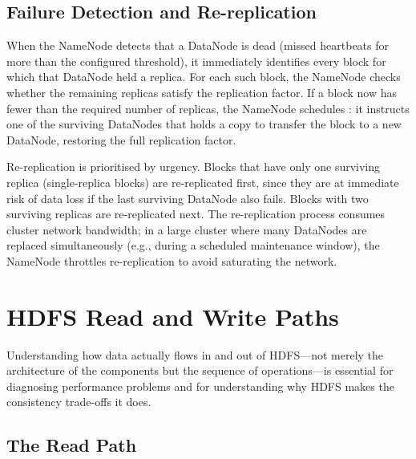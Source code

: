 \subsection{Failure Detection and Re-replication}
\label{subsec:re-replication}

When the NameNode detects that a DataNode is dead (missed heartbeats
for more than the configured threshold), it immediately identifies
every block for which that DataNode held a replica. For each such
block, the NameNode checks whether the remaining replicas satisfy the
replication factor. If a block now has fewer than the required number
of replicas, the NameNode schedules : it instructs
one of the surviving DataNodes that holds a copy to transfer the block
to a new DataNode, restoring the full replication factor.

Re-replication is prioritised by urgency. Blocks that have only one
surviving replica (single-replica blocks) are re-replicated first,
since they are at immediate risk of data loss if the last surviving
DataNode also fails. Blocks with two surviving replicas are re-replicated
next. The re-replication process consumes cluster network bandwidth; in
a large cluster where many DataNodes are replaced simultaneously (e.g.,
during a scheduled maintenance window), the NameNode throttles
re-replication to avoid saturating the network.

\section{HDFS Read and Write Paths}
\label{sec:hdfs-io}

Understanding how data actually flows in and out of HDFS---not merely
the architecture of the components but the sequence of operations---is
essential for diagnosing performance problems and for understanding why
HDFS makes the consistency trade-offs it does.

\subsection{The Read Path}
\label{subsec:read-path}

